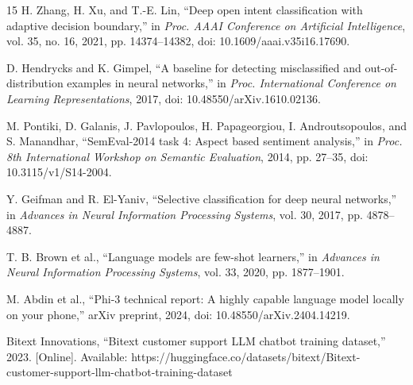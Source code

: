 \begin{thebibliography}{15}
 H. Zhang, H. Xu, and T.-E. Lin, ``Deep open intent classification with adaptive decision boundary,'' in \emph{Proc. AAAI Conference on Artificial Intelligence}, vol. 35, no. 16, 2021, pp. 14374--14382, doi: 10.1609/aaai.v35i16.17690.

 D. Hendrycks and K. Gimpel, ``A baseline for detecting misclassified and out-of-distribution examples in neural networks,'' in \emph{Proc. International Conference on Learning Representations}, 2017, doi: 10.48550/arXiv.1610.02136.

 M. Pontiki, D. Galanis, J. Pavlopoulos, H. Papageorgiou, I. Androutsopoulos, and S. Manandhar, ``SemEval-2014 task 4: Aspect based sentiment analysis,'' in \emph{Proc. 8th International Workshop on Semantic Evaluation}, 2014, pp. 27--35, doi: 10.3115/v1/S14-2004.

 Y. Geifman and R. El-Yaniv, ``Selective classification for deep neural networks,'' in \emph{Advances in Neural Information Processing Systems}, vol. 30, 2017, pp. 4878--4887.

 T. B. Brown et al., ``Language models are few-shot learners,'' in \emph{Advances in Neural Information Processing Systems}, vol. 33, 2020, pp. 1877--1901.

 M. Abdin et al., ``Phi-3 technical report: A highly capable language model locally on your phone,'' arXiv preprint, 2024, doi: 10.48550/arXiv.2404.14219.

 Bitext Innovations, ``Bitext customer support LLM chatbot training dataset,'' 2023. [Online]. Available: https://huggingface.co/datasets/bitext/Bitext-customer-support-llm-chatbot-training-dataset

\end{thebibliography}
